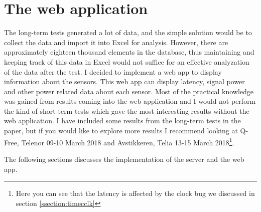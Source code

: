 \documentclass[USenglish]{ifimaster}  %
\begin{document}
\begin{table}[H]
\centering
{}
\caption[\textbf{nbiot\_labtest\_details.py} parameters]{\textbf{nbiot\_labtest\_details.py} parameters. See \href{https://github.com/henninghaakonsen/thesis/blob/master/code/nbiot_labtest_details.py}{\acrshort{nb-iot} details}\cite{code:nbiotdetails} for complete code}
\label{table:nbiotdetails}
\end{table}

\chapter{The web application} \label{chapter:webapp}
The long-term tests generated a lot of data, and the simple solution would be to collect the data and import it into Excel for analysis. However, there are approximately eighteen thousand elements in the database, thus maintaining and keeping track of this data in Excel would not suffice for an effective analyzation of the data after the test. I decided to implement a web app to display information about the sensors. This web app can display latency, signal power and other power related data about each sensor. Most of the practical knowledge was gained from results coming into the web application and I would not perform the kind of short-term tests which gave the most interesting results without the web application. I have included some results from the long-term tests in the paper, but if you would like to explore more results I recommend looking at Q-Free, Telenor 09-10 March 2018 and Avstikkeren, Telia 13-15 March 2018\footnote{Here you can see that the latency is affected by the clock bug we discussed in section \vref{ssection:timecclk}}.

The following sections discusses the implementation of the server and the web app.
\end{document}
